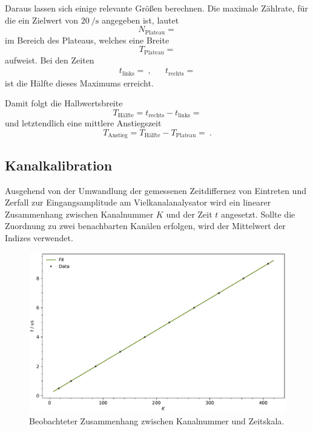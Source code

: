 Daraus lassen sich einige relevante Größen berechnen. Die maximale Zählrate, für die ein Zielwert von $\qty{20}{\per\second}$
angegeben ist, lautet
\begin{equation*}
	N_\text{Plateau} = 
\end{equation*}
im Bereich des Plateaus, welches eine Breite
\begin{equation*}
	T_\text{Plateau} = 
\end{equation*}
aufweist. Bei den Zeiten
\begin{align*}
	t_\text{links} =  \: , && t_\text{rechts} = 
\end{align*}
ist die Hälfte dieses Maximums erreicht.

Damit folgt die Halbwertsbreite
\begin{equation*}
	T_\text{Hälfte} = t_\text{rechts} - t_\text{links} = 
\end{equation*}
und letztendlich eine mittlere Anstiegszeit
\begin{equation*}
	T_\text{Anstieg} = T_\text{Hälfte} - T_\text{Plateau} =  \: .
\end{equation*}



\subsection{Kanalkalibration}

Ausgehend von der Umwandlung der gemessenen Zeitdiffernez von Eintreten und Zerfall zur Eingangsamplitude am
Vielkanalanalysator wird ein linearer Zusammenhang zwischen Kanalnummer $K$ und der Zeit $t$ angesetzt. Sollte
die Zuordnung zu zwei benachbarten Kanälen erfolgen, wird der Mittelwert der Indizes verwendet.

\begin{figure}[H]
	\centering
	\includegraphics[width=\textwidth]{build/calibration.pdf}
	\caption{Beobachteter Zusammenhang zwischen Kanalnummer und Zeitskala.}
	\label{fig:calibration}
\end{figure}

